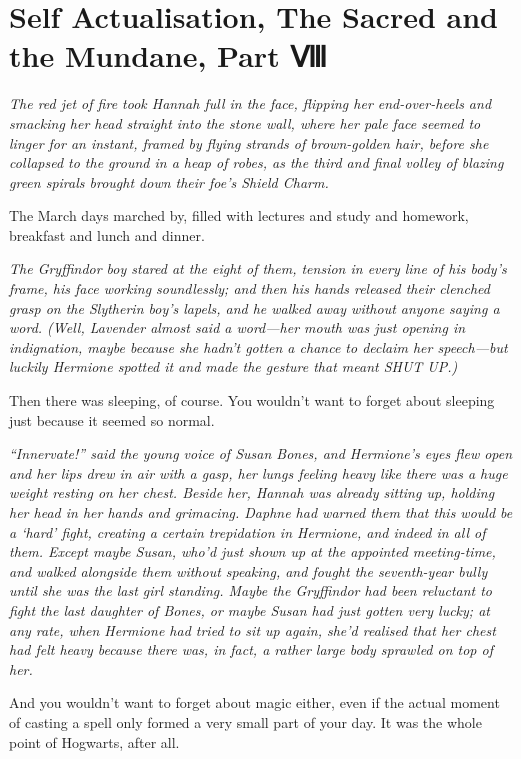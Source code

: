 \chapter{Self Actualisation, The Sacred and the Mundane, Part Ⅷ}

\emph{The red jet of fire took Hannah full in the face, flipping her
end-over-heels and smacking her head straight into the stone wall, where
her pale face seemed to linger for an instant, framed by flying strands
of brown-golden hair, before she collapsed to the ground in a heap of
robes, as the third and final volley of blazing green spirals brought
down their foe's Shield Charm.}

The March days marched by, filled with lectures and study and homework,
breakfast and lunch and dinner.

\emph{The Gryffindor boy stared at the eight of them, tension in every
line of his body's frame, his face working soundlessly; and then his
hands released their clenched grasp on the Slytherin boy's lapels, and
he walked away without anyone saying a word. (Well, Lavender almost said
a word---her mouth was just opening in indignation, maybe because she
hadn't gotten a chance to declaim her speech---but luckily Hermione
spotted it and made the gesture that meant SHUT UP.)}

Then there was sleeping, of course. You wouldn't want to forget about
sleeping just because it seemed so normal.

\emph{``Innervate!'' said the young voice of Susan Bones, and Hermione's
eyes flew open and her lips drew in air with a gasp, her lungs feeling
heavy like there was a huge weight resting on her chest. Beside her,
Hannah was already sitting up, holding her head in her hands and
grimacing. Daphne had warned them that this would be a `hard' fight,
creating a certain trepidation in Hermione, and indeed in all of them.
Except maybe Susan, who'd just shown up at the appointed meeting-time,
and walked alongside them without speaking, and fought the seventh-year
bully until she was the last girl standing. Maybe the Gryffindor had
been reluctant to fight the last daughter of Bones, or maybe Susan had
just gotten very lucky; at any rate, when Hermione had tried to sit up
again, she'd realised that her chest had felt heavy because there was,
in fact, a rather large body sprawled on top of her.}

And you wouldn't want to forget about magic either, even if the actual
moment of casting a spell only formed a very small part of your day. It
was the whole point of Hogwarts, after all.

